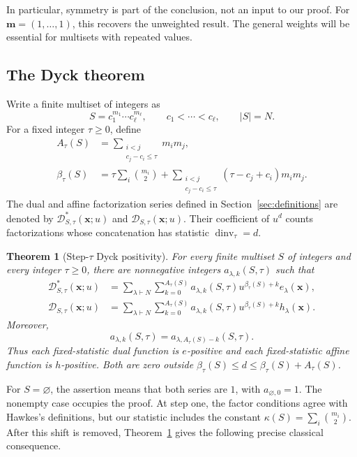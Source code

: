 \documentclass[11pt,reqno]{amsart}
\newcommand{\xx}{\mathbf x}
\newcommand{\mm}{\mathbf m}
\newcommand{\DD}{\mathcal D}
\newcommand{\dinv}{\operatorname{dinv}}
\newtheorem{maintheorem}{Theorem}
\theoremstyle{definition}
\theoremstyle{remark}
\numberwithin{equation}{section}
\begin{document}
In particular, symmetry is part of the conclusion, not an input to our
proof.  For $\mm=(1,\ldots,1)$, this recovers the unweighted result.
The general weights will be essential for multisets with repeated values.

\subsection{The Dyck theorem}
Write a finite multiset of integers as
\[
 S=c_1^{m_1}\cdots c_\ell^{m_\ell},\qquad
 c_1<\cdots<c_\ell,\qquad |S|=N.
\]
For a fixed integer $\tau\geq0$, define
\begin{align}
 A_\tau(S)&=\sum_{\substack{i<j\\c_j-c_i\leq\tau}}m_i m_j,
       \label{eq:Atau}\\
 \beta_\tau(S)&=\tau\sum_i\binom{m_i}{2}
  +\sum_{\substack{i<j\\c_j-c_i\leq\tau}}
       (\tau-c_j+c_i)m_i m_j.\label{eq:beta}
\end{align}
The dual and affine factorization series defined in
Section~\ref{sec:definitions} are denoted by
$\DD^*_{S,\tau}(\xx;u)$ and $\DD_{S,\tau}(\xx;u)$.  Their coefficient of
$u^d$ counts factorizations whose concatenation has statistic
$\dinv_\tau=d$.

\begin{maintheorem}[Step-$\tau$ Dyck positivity]\label{thm:B}
For every finite multiset $S$ of integers and every integer $\tau\geq0$,
there are nonnegative integers $a_{\lambda,k}(S,\tau)$ such that
\begin{align}
 \DD^*_{S,\tau}(\xx;u)
  &=\sum_{\lambda\vdash N}\sum_{k=0}^{A_\tau(S)}
       a_{\lambda,k}(S,\tau)u^{\beta_\tau(S)+k}e_\lambda(\xx),
       \label{eq:thmB-dual}\\
 \DD_{S,\tau}(\xx;u)
  &=\sum_{\lambda\vdash N}\sum_{k=0}^{A_\tau(S)}
       a_{\lambda,k}(S,\tau)u^{\beta_\tau(S)+k}h_\lambda(\xx).
       \label{eq:thmB-affine}
\end{align}
Moreover,
\begin{equation}\label{eq:thmB-pal}
 a_{\lambda,k}(S,\tau)
   =a_{\lambda,A_\tau(S)-k}(S,\tau).
\end{equation}
Thus each fixed-statistic dual function is $e$-positive and each
fixed-statistic affine function is $h$-positive.  Both are zero outside
$\beta_\tau(S)\leq d\leq\beta_\tau(S)+A_\tau(S)$.
\end{maintheorem}

For $S=\varnothing$, the assertion means that both series are $1$,
with $a_{\varnothing,0}=1$.  The nonempty case occupies the proof.
At step one, the factor conditions agree with Hawkes's definitions, but
our statistic includes the constant
$\kappa(S)=\sum_i\binom{m_i}{2}$.  After this shift is removed,
Theorem~\ref{thm:B} gives the following precise classical consequence.
\end{document}
